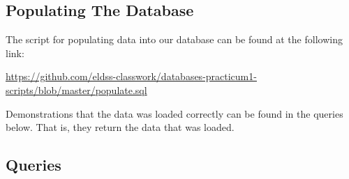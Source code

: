 \documentclass[
]{article}
\begin{document}
\hypertarget{populating-the-database}{%
\subsection{Populating The Database}\label{populating-the-database}}

The script for populating data into our database can be found at the
following link:

\url{https://github.com/eldss-classwork/databases-practicum1-scripts/blob/master/populate.sql}

Demonstrations that the data was loaded correctly can be found in the
queries below. That is, they return the data that was loaded.

\hypertarget{queries}{%
\subsection{Queries}\label{queries}}
\end{document}
